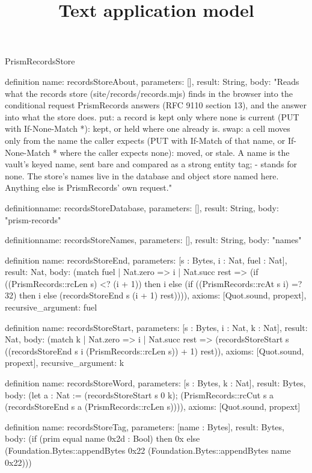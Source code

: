 \begin{lexlean}{PrismRecordsStore}
\title{Text application model}
\begin{semanticmodule}
definition{
  name: recordsStoreAbout,
  parameters: [],
  result: String,
  body: "Reads what the records store (site/records/records.mjs) finds in the browser into the conditional request PrismRecords answers (RFC 9110 section 13), and the answer into what the store does. put: a record is kept only where none is current (PUT with If-None-Match *): kept, or held where one already is. swap: a cell moves only from the name the caller expects (PUT with If-Match of that name, or If-None-Match * where the caller expects none): moved, or stale. A name is the vault's keyed name, sent bare and compared as a strong entity tag; - stands for none. The store's names live in the database and object store named here. Anything else is PrismRecords' own request."
}

definition{name: recordsStoreDatabase, parameters: [], result: String, body: "prism-records"}

definition{name: recordsStoreNames, parameters: [], result: String, body: "names"}

definition{
  name: recordsStoreEnd,
  parameters: [s : Bytes, i : Nat, fuel : Nat],
  result: Nat,
  body: (match fuel
    | Nat.zero => i
    | Nat.succ rest => (if ((PrismRecords::rcLen s) <? (i + 1)) then i else (if ((PrismRecords::rcAt s i) =? 32) then i else (recordsStoreEnd s (i + 1) rest)))),
  axioms: [Quot.sound, propext],
  recursive_argument: fuel
}

definition{
  name: recordsStoreStart,
  parameters: [s : Bytes, i : Nat, k : Nat],
  result: Nat,
  body: (match k
    | Nat.zero => i
    | Nat.succ rest => (recordsStoreStart s ((recordsStoreEnd s i (PrismRecords::rcLen s)) + 1) rest)),
  axioms: [Quot.sound, propext],
  recursive_argument: k
}

definition{
  name: recordsStoreWord,
  parameters: [s : Bytes, k : Nat],
  result: Bytes,
  body: (let a : Nat := (recordsStoreStart s 0 k); (PrismRecords::rcCut s a (recordsStoreEnd s a (PrismRecords::rcLen s)))),
  axioms: [Quot.sound, propext]
}

definition{
  name: recordsStoreTag,
  parameters: [name : Bytes],
  result: Bytes,
  body: (if (prim equal name 0x2d : Bool) then 0x else (Foundation.Bytes::appendBytes 0x22 (Foundation.Bytes::appendBytes name 0x22)))
}


\end{semanticmodule}
\end{lexlean}
